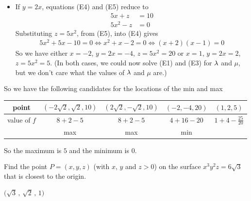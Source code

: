 \begin{solution}
\begin{itemize}
\item If $y=2x$, equations (E4) and (E5) reduce to
\begin{align*}
5x + z &= 10\tag{E4} \\
5x^2  - z &= 0 \tag{E5}
\end{align*}
Substituting $z=5x^2$, from (E5), into (E4) gives
\begin{align*}
5x^2+5x-10=0
\iff 
x^2+x-2=0
\iff
(x+2)(x-1)=0
\end{align*}
So we have either $x=-2$, $y=2x=-4$, $z=5x^2=20$
               or $x=1$, $y=2x=2$, $z=5x^2=5$. 
(In both cases, we could now solve (E1) and (E3) for $\lambda$ and $\mu$,
but we don't care what the values of $\lambda$ and $\mu$ are.) 

\end{itemize}
So we have the following candidates for the locations of the min and max
\begin{center}
\renewcommand{\arraystretch}{1.3}
     \begin{tabular}{|c|c|c|c|c|}
     \hline
       point
       &$(-2\sqrt{2},\sqrt{2}, 10)$
       &$(2\sqrt{2},-\sqrt{2}, 10)$
       &$(-2,-4,20) $
       &$(1,2,5) $ \\ \hline
       value of $f$
       &$8+2-5$
       &$8+2-5$
       &$4+16-20$
       &$1+4-\frac{25}{20}$\\ \hline
       &max
       &max 
       &min 
       & \\ \hline
     \end{tabular}
\renewcommand{\arraystretch}{1.0}
\end{center}
So the maximum is $5$ and the minimum is $0$.
\end{solution}

\begin{question}[M200 2010D] %
Find the point $P = (x, y, z)$ (with $x$, $y$ and $z> 0$) on the surface $x^3 y^2 z = 6 \sqrt{3}$
that is closest to the origin.
\end{question}

%

\begin{answer}
$\big(\sqrt{3}\,,\,\sqrt{2}\,,\,1\big)$
\end{answer}

